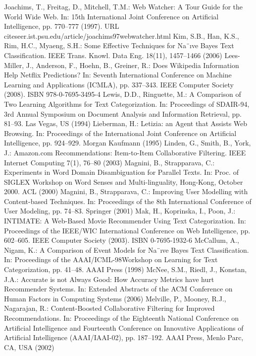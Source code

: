 \begin{thebibliography}{99}
Joachims, T., Freitag, D., Mitchell, T.M.: Web Watcher: A Tour Guide for the World Wide Web. In: 15th International Joint Conference on Artificial Intelligence, pp. 770–777 (1997). URL citeseer.ist.psu.edu/article/joachims97webwatcher.html
Kim, S.B., Han, K.S., Rim, H.C., Myaeng, S.H.: Some Effective Techniques for Na¨ıve Bayes Text Classification. IEEE Trans. Knowl. Data Eng. 18(11), 1457–1466 (2006)
Lees-Miller, J., Anderson, F., Hoehn, B., Greiner, R.: Does Wikipedia Information Help Netflix Predictions? In: Seventh International Conference on Machine Learning and Applications (ICMLA), pp. 337–343. IEEE Computer Society (2008). ISBN 978-0-7695-3495-4
Lewis, D.D., Ringuette, M.: A Comparison of Two Learning Algorithms for Text Categorization. In: Proceedings of SDAIR-94, 3rd Annual Symposium on Document Analysis and Information Retrieval, pp. 81–93. Las Vegas, US (1994)
Lieberman, H.: Letizia: an Agent that Assists Web Browsing. In: Proceedings of the International Joint Conference on Artificial Intelligence, pp. 924–929. Morgan Kaufmann (1995)
Linden, G., Smith, B., York, J.: Amazon.com Recommendations: Item-to-Item Collaborative Filtering. IEEE Internet Computing 7(1), 76–80 (2003)
Magnini, B., Strapparava, C.: Experiments in Word Domain Disambiguation for Parallel Texts. In: Proc. of SIGLEX Workshop on Word Senses and Multi-linguality, Hong-Kong, October 2000. ACL (2000)
Magnini, B., Strapparava, C.: Improving User Modelling with Content-based Techniques. In: Proceedings of the 8th International Conference of User Modeling, pp. 74–83. Springer (2001)
Mak, H., Koprinska, I., Poon, J.: INTIMATE: A Web-Based Movie Recommender Using Text Categorization. In: Proceedings of the IEEE/WIC International Conference on Web Intelligence, pp. 602–605. IEEE Computer Society (2003). ISBN 0-7695-1932-6
McCallum, A., Nigam, K.: A Comparison of Event Models for Na¨ıve Bayes Text Classification. In: Proceedings of the AAAI/ICML-98Workshop on Learning for Text Categorization, pp. 41–48. AAAI Press (1998)
McNee, S.M., Riedl, J., Konstan, J.A.: Accurate is not Always Good: How Accuracy Metrics have hurt Recommender Systems. In: Extended Abstracts of the ACM Conference on Human Factors in Computing Systems (2006)
Melville, P., Mooney, R.J., Nagarajan, R.: Content-Boosted Collaborative Filtering for Improved Recommendations. In: Proceedings of the Eighteenth National Conference on Artificial Intelligence and Fourteenth Conference on Innovative Applications of Artificial Intelligence (AAAI/IAAI-02), pp. 187–192. AAAI Press, Menlo Parc, CA, USA (2002)

\end{thebibliography}
